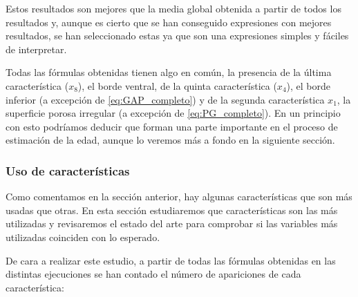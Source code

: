 Estos resultados son mejores que la media global obtenida a partir de todos los resultados y, aunque es cierto que se han conseguido expresiones con mejores resultados, se han seleccionado estas ya que son una expresiones simples y fáciles de interpretar.

Todas las fórmulas obtenidas tienen algo en común, la presencia de la última característica ($x_8$), el borde ventral, de la quinta característica ($x_4$), el borde inferior (a excepción de \ref{eq:GAP_completo}) y de la segunda característica $x_1$, la superficie porosa irregular (a excepción de \ref{eq:PG_completo}). En un principio con esto podríamos deducir que forman una parte importante en el proceso de estimación de la edad, aunque lo veremos más a fondo en la siguiente sección.



\subsubsection{Uso de características}

Como comentamos en la sección anterior, hay algunas características que son más usadas que otras. En esta sección estudiaremos que características son las más utilizadas y revisaremos el estado del arte para comprobar si las variables más utilizadas coinciden con lo esperado.

De cara a realizar este estudio, a partir de todas las fórmulas obtenidas en las distintas ejecuciones se han contado el número de apariciones de cada característica:

